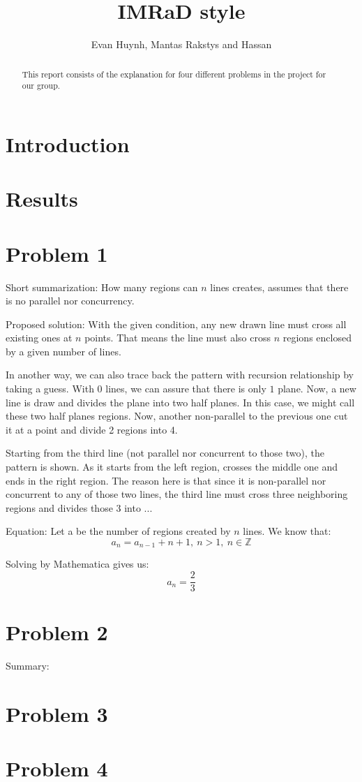 \documentclass[11pt,a4paper]{article}
\begin{document}
\title{IMRaD style}
\author{Evan Huynh, Mantas Rakstys and Hassan}

\maketitle

\begin{abstract}
 This report consists of the explanation for four different problems in the project for our group.
\end{abstract}

\tableofcontents

\section{Introduction}

\section{Results}
\section{Problem 1}
Short summarization: How many regions can \(n\) lines creates, assumes that there is no parallel nor concurrency.

Proposed solution: With the given condition, any new drawn line must cross all existing ones at \(n\) points. That means the line must also cross \(n\) regions enclosed by a given number of lines.

In another way, we can also trace back the pattern with recursion relationship by taking a guess. With \(0\) lines, we can assure that there is only \(1\) plane. Now, a new line is draw and divides the plane into two half planes. In this case, we might call these two half planes regions. Now, another non-parallel to the previous one cut it at a point and divide 2 regions into 4. 

Starting from the third line (not parallel nor concurrent to those two), the pattern is shown. As it starts from the left region, crosses the middle one and ends in the right region. The reason here is that since it is non-parallel nor concurrent to any of those two lines, the third line must cross three neighboring regions and divides those 3 into ... %

Equation: Let a be the number of regions created by \(n\) lines. We know that:
\[a_{n} = a_{n-1} + n + 1, \ n>1, \ n \in \mathds{Z} \]

Solving by Mathematica gives us: 
\[a_{n} = \frac{2}{3}\]

\section{Problem 2}
Summary: 

\section{Problem 3}

\section{Problem 4}

\begin{thebibliography}{99}
 
\end{thebibliography}
\end{document}
